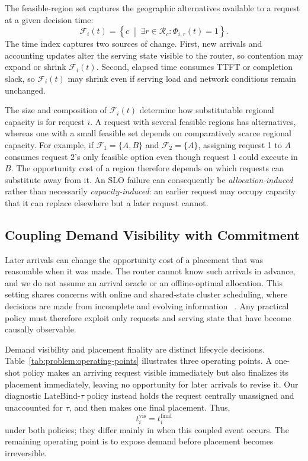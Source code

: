 The feasible-region set captures the geographic alternatives available to a
request at a given decision time:
\begin{equation}
    \mathcal{F}_i(t)
    =
    \left\{
        c
        \;\middle|\;
        \exists r\in\mathcal{R}_c:
        \Phi_{i,r}(t)=1
    \right\}.
    \label{eq:problem:feasible-set}
\end{equation}
The time index captures two sources of change.
First, new arrivals and accounting updates alter the serving state visible to
the router, so contention may expand or shrink $\mathcal{F}_i(t)$.
Second, elapsed time consumes TTFT or completion slack, so
$\mathcal{F}_i(t)$ may shrink even if serving load and network conditions remain
unchanged.

The size and composition of $\mathcal{F}_i(t)$ determine how substitutable
regional capacity is for request $i$.
A request with several feasible regions has alternatives, whereas one with a
small feasible set depends on comparatively scarce regional capacity.
For example, if
$\mathcal{F}_1=\{A,B\}$ and $\mathcal{F}_2=\{A\}$,
assigning request 1 to $A$ consumes request 2's only feasible option even though
request 1 could execute in $B$.
The opportunity cost of a region therefore depends on which requests can
substitute away from it.
An SLO failure can consequently be \emph{allocation-induced} rather than
necessarily \emph{capacity-induced}: an earlier request may occupy capacity
that it can replace elsewhere but a later request cannot.


\subsection{Coupling Demand Visibility with Commitment}
\label{sec:problem:tradeoff}

Later arrivals can change the opportunity cost of a placement that was
reasonable when it was made.
The router cannot know such arrivals in advance, and we do not assume an arrival
oracle or an offline-optimal allocation.
This setting shares concerns with online and shared-state cluster scheduling,
where decisions are made from incomplete and evolving information
~\cite{sparrow,flow_imprecise,omega,firmament}.
Any practical policy must therefore exploit only requests and serving state
that have become causally observable.

Demand visibility and placement finality are distinct lifecycle decisions.
Table~\ref{tab:problem:operating-points} illustrates three operating points.
A one-shot policy makes an arriving request visible immediately but also
finalizes its placement immediately, leaving no opportunity for later arrivals
to revise it.
Our diagnostic LateBind-$\tau$ policy instead holds the request centrally
unassigned and unaccounted for $\tau$, and then makes one final placement.
Thus,
\begin{equation}
    t_i^{\mathrm{vis}}
    =
    t_i^{\mathrm{final}}
\end{equation}
under both policies; they differ mainly in when this coupled event occurs.
The remaining operating point is to expose demand before placement becomes
irreversible.

